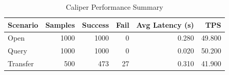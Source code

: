 \begin{table}
\caption{Caliper Performance Summary}
\label{tab:caliper_round}
\begin{tabular}{lrrrrr}
\toprule
Scenario & Samples & Success & Fail & Avg Latency (s) & TPS \\
\midrule
Open & 1000 & 1000 & 0 & 0.280 & 49.800 \\
Query & 1000 & 1000 & 0 & 0.020 & 50.200 \\
Transfer & 500 & 473 & 27 & 0.310 & 41.900 \\
\bottomrule
\end{tabular}
\end{table}

